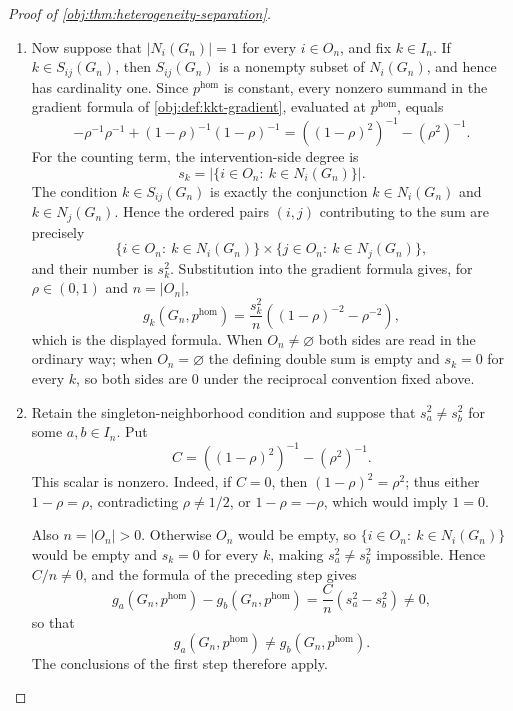\begin{proof}[Proof of \cref{obj:thm:heterogeneity-separation}]
\begin{enumerate}
\item Now suppose that \(|N_i(G_n)|=1\) for every \(i\in O_n\), and fix \(k\in I_n\).  If \(k\in S_{ij}(G_n)\), then \(S_{ij}(G_n)\) is a nonempty subset of \(N_i(G_n)\), and hence has cardinality one.  Since \(p^{\mathrm{hom}}\) is constant, every nonzero summand in the gradient formula of \cref{obj:def:kkt-gradient}, evaluated at \(p^{\mathrm{hom}}\), equals
\[
-\rho^{-1}\rho^{-1}+(1-\rho)^{-1}(1-\rho)^{-1}
=((1-\rho)^2)^{-1}-(\rho^2)^{-1}.
\]
For the counting term, the intervention-side degree is
\[
s_k=\left|\{i\in O_n:\ k\in N_i(G_n)\}\right|.
\]
The condition \(k\in S_{ij}(G_n)\) is exactly the conjunction \(k\in N_i(G_n)\) and \(k\in N_j(G_n)\).  Hence the ordered pairs \((i,j)\) contributing to the sum are precisely
\[
\{i\in O_n:\ k\in N_i(G_n)\}\times
\{j\in O_n:\ k\in N_j(G_n)\},
\]
and their number is \(s_k^2\).  Substitution into the gradient formula gives, for \(\rho\in(0,1)\) and \(n=\lvert O_n\rvert\),
\[
g_k(G_n,p^{\mathrm{hom}})
=
\frac{s_k^2}{n}\left((1-\rho)^{-2}-\rho^{-2}\right),
\]
which is the displayed formula.  When \(O_n\neq\varnothing\) both sides are read in the ordinary way; when \(O_n=\varnothing\) the defining double sum is empty and \(s_k=0\) for every \(k\), so both sides are \(0\) under the reciprocal convention fixed above.

\item Retain the singleton-neighborhood condition and suppose that
\(s_a^2\neq s_b^2\) for some \(a,b\in I_n\).  Put
\[
C=((1-\rho)^2)^{-1}-(\rho^2)^{-1}.
\]
This scalar is nonzero.  Indeed, if \(C=0\), then
\((1-\rho)^2=\rho^2\); thus either \(1-\rho=\rho\), contradicting
\(\rho\neq1/2\), or \(1-\rho=-\rho\), which would imply \(1=0\).

Also \(n=\lvert O_n\rvert>0\).  Otherwise \(O_n\) would be empty, so \(\{i\in O_n:\ k\in N_i(G_n)\}\) would be empty and \(s_k=0\) for every \(k\), making \(s_a^2\neq s_b^2\) impossible.  Hence \(C/n\neq0\), and the formula of the preceding step gives
\[
g_a(G_n,p^{\mathrm{hom}})-g_b(G_n,p^{\mathrm{hom}})
=\frac{C}{n}\left(s_a^2-s_b^2\right)\neq0,
\]
so that
\[
g_a(G_n,p^{\mathrm{hom}})\neq g_b(G_n,p^{\mathrm{hom}}).
\]
The conclusions of the first step therefore apply.
\end{enumerate}
\end{proof}

